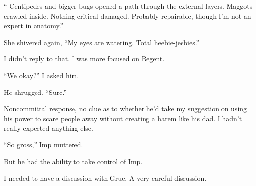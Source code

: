 ``-Centipedes and bigger bugs opened a path through the external layers.  Maggots crawled inside.  Nothing critical damaged.  Probably repairable, though I'm not an expert in anatomy.''



She shivered again, ``My eyes are watering.  Total heebie-jeebies.''



I didn't reply to that.  I was more focused on Regent.



``We okay?'' I asked him.



He shrugged.  ``Sure.''



Noncommittal response, no clue as to whether he'd take my suggestion on using his power to scare people away without creating a harem like his dad.  I hadn't really expected anything else.



``So gross,'' Imp muttered.



But he had the ability to take control of Imp.



I needed to have a discussion with Grue.  A very careful discussion.





